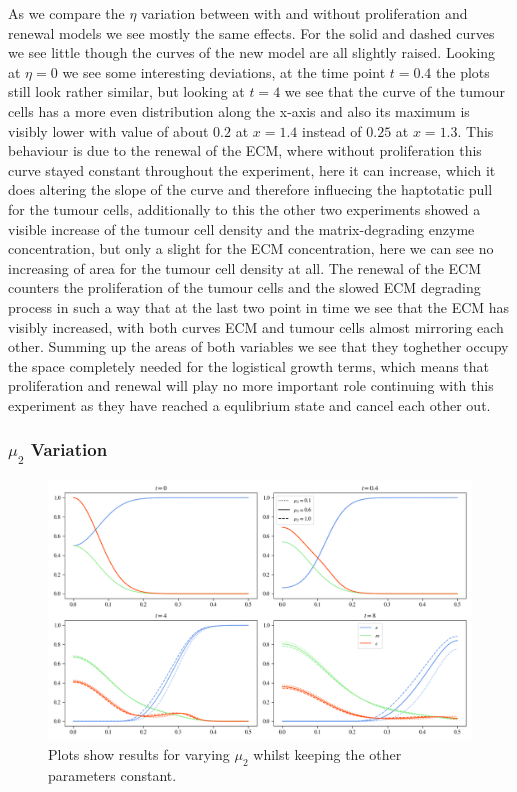 As we compare the $\eta$ variation between with and without proliferation and renewal models we see mostly the same effects. For the solid and dashed curves we see little though the curves of the new model are all slightly raised. Looking at $\eta=0$ we see some interesting deviations, at the time point $t=0.4$ the plots still look rather similar, but looking at $t=4$ we see that the curve of the tumour cells has a more even distribution along the x-axis and also its maximum is visibly lower with value of about $0.2$ at $x=1.4$ instead of $0.25$ at $x=1.3$. This behaviour is due to the renewal of the ECM, where without proliferation this curve stayed constant throughout the experiment, here it can increase, which it does altering the slope of the curve and therefore influecing the haptotatic pull for the tumour cells, additionally to this the other two experiments showed a visible increase of the tumour cell density and the matrix-degrading enzyme concentration, but only a slight for the ECM concentration, here we can see no increasing of area for the tumour cell density at all. The renewal of the ECM counters the proliferation of the tumour cells and the slowed ECM degrading process in such a way that at the last two point in time we see that the ECM has visibly increased, with both curves ECM and tumour cells almost mirroring each other. Summing up the areas of both variables we see that they toghether occupy the space completely needed for the logistical growth terms, which means that proliferation and renewal will play no more important role continuing with this experiment as they have reached a equlibrium state and cancel each other out. 


\subsubsection*{$\mu_2$ Variation}
\begin{figure}[h]
    \centering
    \includegraphics[width=\textwidth]{resources/images/prolif_mu_2_variation.png}
    \caption{Plots show results for varying $\mu_2$ whilst keeping the other parameters constant.}
    \label{fig:prolif_mu_2_variation}
\end{figure}

